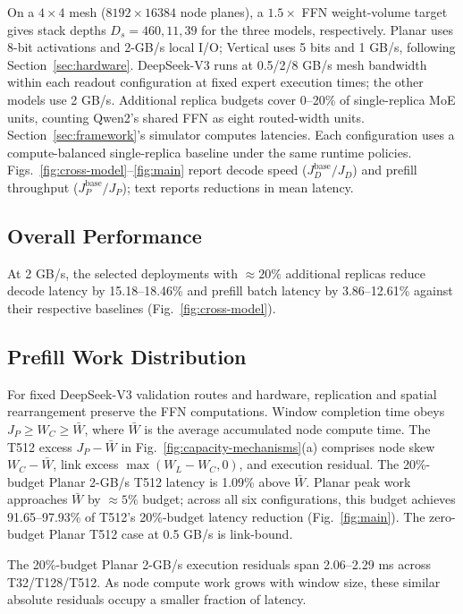 On a $4\times4$ mesh ($8192\times16384$ node planes), a $1.5\times$ FFN weight-volume target gives stack depths $D_s=460,11,39$ for the three models, respectively. Planar uses 8-bit activations and 2-GB/s local I/O; Vertical uses 5 bits and 1 GB/s, following Section~\ref{sec:hardware}. DeepSeek-V3 runs at 0.5/2/8 GB/s mesh bandwidth within each readout configuration at fixed expert execution times; the other models use 2 GB/s. Additional replica budgets cover 0--20\% of single-replica MoE units, counting Qwen2's shared FFN as eight routed-width units. Section~\ref{sec:framework}'s simulator computes latencies. Each configuration uses a compute-balanced single-replica baseline under the same runtime policies. Figs.~\ref{fig:cross-model}--\ref{fig:main} report decode speed ($J_D^{\mathrm{base}}/J_D$) and prefill throughput ($J_P^{\mathrm{base}}/J_P$); text reports reductions in mean latency.

\subsection{Overall Performance}

At 2 GB/s, the selected deployments with $\approx20\%$ additional replicas reduce decode latency by 15.18--18.46\% and prefill batch latency by 3.86--12.61\% against their respective baselines (Fig.~\ref{fig:cross-model}).

\subsection{Prefill Work Distribution}

For fixed DeepSeek-V3 validation routes and hardware, replication and spatial rearrangement preserve the FFN computations. Window completion time obeys $J_P\ge W_C\ge\bar W$, where $\bar W$ is the average accumulated node compute time. The T512 excess $J_P-\bar W$ in Fig.~\ref{fig:capacity-mechanisms}(a) comprises node skew $W_C-\bar W$, link excess $\max(W_L-W_C,0)$, and execution residual. The 20\%-budget Planar 2-GB/s T512 latency is 1.09\% above $\bar W$. Planar peak work approaches $\bar W$ by $\approx5\%$ budget; across all six configurations, this budget achieves 91.65--97.93\% of T512's 20\%-budget latency reduction (Fig.~\ref{fig:main}). The zero-budget Planar T512 case at 0.5 GB/s is link-bound.

The 20\%-budget Planar 2-GB/s execution residuals span 2.06--2.29 ms across T32/T128/T512. As node compute work grows with window size, these similar absolute residuals occupy a smaller fraction of latency.

